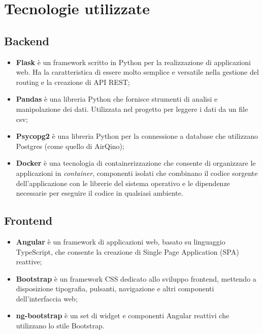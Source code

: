 \section{Tecnologie utilizzate}\label{sec:tecnologie}

\subsection{Backend}\label{ssec:interfaccia-backend}

\begin{itemize}
  \item \textbf{Flask} \cite{flask} è un framework scritto in Python per la realizzazione di applicazioni web. Ha la caratteristica di essere molto semplice e versatile nella gestione del routing e la creazione di API REST;
  \item \textbf{Pandas} \cite{pandas} è una libreria Python che fornisce strumenti di analisi e manipolazione dei dati. Utilizzata nel progetto per leggere i dati da un file csv;
  \item \textbf{Psycopg2} \cite{psycopg2} è una libreria Python per la connessione a database che utilizzano Postgres (come quello di AirQino);
  \item \textbf{Docker} \cite{docker} è una tecnologia di containerizzazione che consente di organizzare le applicazioni in \textit{container}, componenti isolati che combinano il codice sorgente dell'applicazione con le librerie del sistema operativo e le dipendenze necessarie per eseguire il codice in qualsiasi ambiente. 
\end{itemize}

\clearpage

\subsection{Frontend}\label{ssec:interfaccia-frontend}

\begin{itemize}
  \item \textbf{Angular} \cite{angular} è un framework di applicazioni web, basato su linguaggio TypeScript, che consente la creazione di Single Page Application (SPA) reattive;
  \item \textbf{Bootstrap} \cite{bootstrap} è un framework CSS dedicato allo sviluppo frontend, mettendo a disposizione tipografia, pulsanti, navigazione e altri componenti dell'interfaccia web;
  \item \textbf{ng-bootstrap} \cite{ng-bootstrap} è un set di widget e componenti Angular reattivi che utilizzano lo stile Bootstrap.
\end{itemize}

